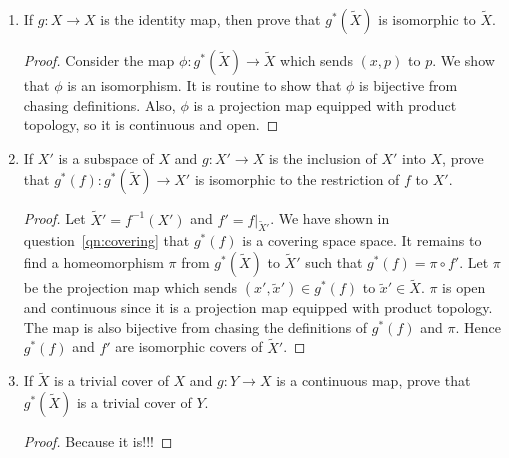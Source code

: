 \documentclass{article}
\begin{document}
\begin{enumerate}
\begin{enumerate}
      \item If $g:X\rightarrow X$ is the identity map, then prove that
        $g^*(\tilde{X})$ is isomorphic to $\tilde{X}$.
        \begin{proof}
          Consider the map $\phi:g^*(\tilde{X})\rightarrow\tilde{X}$ which
          sends $(x,p)$ to $p$. We show that $\phi$ is an isomorphism.
          It is routine to show that $\phi$ is bijective from chasing
          definitions. Also, $\phi$ is a projection map equipped with
          product topology, so it is continuous and open.
        \end{proof}

      \item If $X'$ is a subspace of $X$ and $g:X'\rightarrow X$ is the
        inclusion of $X'$ into $X$, prove that
        $g^*(f):g^*(\tilde{X})\rightarrow X'$ is isomorphic to the
        restriction of $f$ to $X'$.

        \begin{proof}
          Let $\tilde{X}'=f^{-1}(X')$ and $f'=f|_{\tilde{X}'}$. We have
          shown in question~\ref{qn:covering} that $g^*(f)$ is a covering
          space space. It remains to find a homeomorphism $\pi$ from
          $g^*(\tilde{X})$ to $\tilde{X}'$ such that $g^*(f)=\pi\circ f'$.
          Let $\pi$ be the projection map which sends $(x',\tilde{x}')\in
          g^*(f)$ to $\tilde{x}'\in\tilde{X}$. $\pi$ is open and continuous
          since it is a projection map equipped with product topology. The
          map is also bijective from chasing the definitions of $g^*(f)$
          and $\pi$. Hence $g^*(f)$ and $f'$ are isomorphic covers of
          $\tilde{X}'$.
        \end{proof}

      \item If $\tilde{X}$ is a trivial cover of $X$ and $g:Y\rightarrow X$
        is a continuous map, prove that $g^*(\tilde{X})$ is a trivial cover
        of $Y$.

        \begin{proof}
          Because it is!!!
        \end{proof}
    \end{enumerate}
\end{enumerate}
\end{document}
